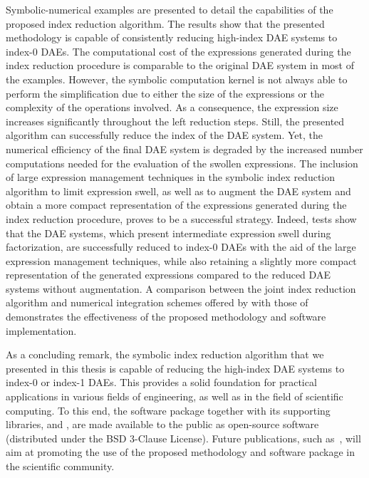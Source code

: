 Symbolic-numerical examples are presented to detail the capabilities of the proposed index reduction algorithm. The results show that the presented methodology is capable of consistently reducing high-index \ac{DAE} systems to index-0 \acp{DAE}. The computational cost of the expressions generated during the index reduction procedure is comparable to the original \ac{DAE} system in most of the examples. However, the \Maple{} symbolic computation kernel is not always able to perform the simplification due to either the size of the expressions or the complexity of the operations involved. As a consequence, the expression size increases significantly throughout the left reduction steps. Still, the presented algorithm can successfully reduce the index of the \ac{DAE} system. Yet, the numerical efficiency of the final \ac{DAE} system is degraded by the increased number computations needed for the evaluation of the swollen expressions. The inclusion of large expression management techniques in the symbolic index reduction algorithm to limit expression swell, as well as to augment the \ac{DAE} system and obtain a more compact representation of the expressions generated during the index reduction procedure, proves to be a successful strategy. Indeed, tests show that the \ac{DAE} systems, which present intermediate expression swell during factorization, are successfully reduced to index-0 \acp{DAE} with the aid of the large expression management techniques, while also retaining a slightly more compact representation of the generated expressions compared to the reduced \ac{DAE} systems without augmentation. A comparison between the joint index reduction algorithm and numerical integration schemes offered by \Maple{} with those of \Indigo{} demonstrates the effectiveness of the proposed methodology and software implementation.

As a concluding remark, the symbolic index reduction algorithm that we presented in this thesis is capable of reducing the high-index \ac{DAE} systems to index-0 or index-1 \acp{DAE}. This provides a solid foundation for practical applications in various fields of engineering, as well as in the field of scientific computing. To this end, the \Indigo{} software package together with its supporting libraries, \LEM{} and \LAST{}, are made available to the public as open-source software (distributed under the BSD 3-Clause License). Future publications, such as~\cite{stocco2024imece_solution}, will aim at promoting the use of the proposed methodology and software package in the scientific community.

